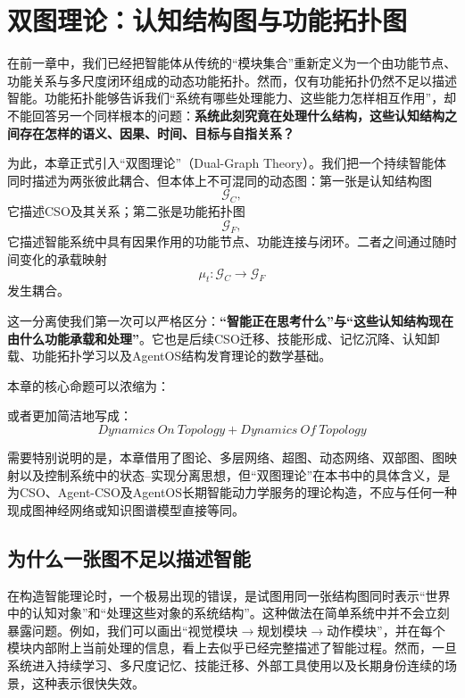 \chapter{双图理论：认知结构图与功能拓扑图}

\begin{chapterlead}
在前一章中，我们已经把智能体从传统的“模块集合”重新定义为一个由功能节点、功能关系与多尺度闭环组成的动态功能拓扑。然而，仅有功能拓扑仍然不足以描述智能。功能拓扑能够告诉我们“系统有哪些处理能力、这些能力怎样相互作用”，却不能回答另一个同样根本的问题：\textbf{系统此刻究竟在处理什么结构，这些认知结构之间存在怎样的语义、因果、时间、目标与自指关系？}

为此，本章正式引入“双图理论”（Dual-Graph Theory）。我们把一个持续智能体同时描述为两张彼此耦合、但本体上不可混同的动态图：第一张是认知结构图
\[
\mathcal G_C,
\]
它描述CSO及其关系；第二张是功能拓扑图
\[
\mathcal G_F,
\]
它描述智能系统中具有因果作用的功能节点、功能连接与闭环。二者之间通过随时间变化的承载映射
\[
\mu_t:\mathcal G_C\rightarrow\mathcal G_F
\]
发生耦合。

这一分离使我们第一次可以严格区分：\textbf{“智能正在思考什么”与“这些认知结构现在由什么功能承载和处理”}。它也是后续CSO迁移、技能形成、记忆沉降、认知卸载、功能拓扑学习以及AgentOS结构发育理论的数学基础。

本章的核心命题可以浓缩为：
\begin{statementbox}
\centering
{}
\end{statementbox}
或者更加简洁地写成：
\[
\boxed{
Dynamics\ On\ Topology
+
Dynamics\ Of\ Topology
}
\]

需要特别说明的是，本章借用了图论、多层网络、超图、动态网络、双部图、图映射以及控制系统中的状态--实现分离思想，但“双图理论”在本书中的具体含义，是为CSO、Agent-CSO及AgentOS长期智能动力学服务的理论构造，不应与任何一种现成图神经网络或知识图谱模型直接等同。
\end{chapterlead}


\section{为什么一张图不足以描述智能}

在构造智能理论时，一个极易出现的错误，是试图用同一张结构图同时表示“世界中的认知对象”和“处理这些对象的系统结构”。这种做法在简单系统中并不会立刻暴露问题。例如，我们可以画出“视觉模块$\rightarrow$规划模块$\rightarrow$动作模块”，并在每个模块内部附上当前处理的信息，看上去似乎已经完整描述了智能过程。然而，一旦系统进入持续学习、多尺度记忆、技能迁移、外部工具使用以及长期身份连续的场景，这种表示很快失效。

